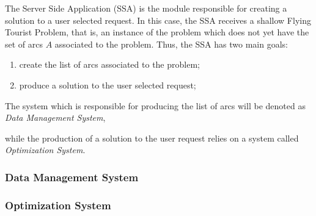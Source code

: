 The Server Side Application (SSA) is the module responsible for creating a solution 
to a user selected request. In this case, the SSA receives a shallow Flying Tourist Problem,
that is, an instance of the problem which does not yet have the set of arcs $A$ associated to the problem.
Thus, the SSA has two main goals:

\begin{enumerate}
  \item create the list of arcs associated to the problem;
  \item produce a solution to the user selected request;
\end{enumerate}

The system which is responsible for producing the list of arcs will be denoted as \textit{Data Management System},

while the production of a solution to the user request relies on a system called \textit{Optimization System}.




\subsubsection{Data Management System}
\label{sec:dms_design}


\subsubsection{Optimization System}
\label{sec:optimization_design}


